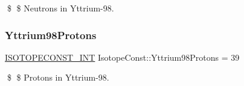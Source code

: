 \$ \$ Neutrons in Yttrium-\/98. \mbox{\label{group___isotope_const-_yttrium-_y98_ga075e745923c6c56f67bf7877c6320368}} 
\subsubsection{\texorpdfstring{Yttrium98\+Protons}{Yttrium98Protons}}
{\footnotesize\ttfamily \mbox{\hyperlink{group___isotope_const-_macros_ga5f18360b3e99483a35c32d789e62621c}{I\+S\+O\+T\+O\+P\+E\+C\+O\+N\+S\+T\+\_\+\+I\+NT}} Isotope\+Const\+::\+Yttrium98\+Protons = 39}

\$ \$ Protons in Yttrium-\/98. 